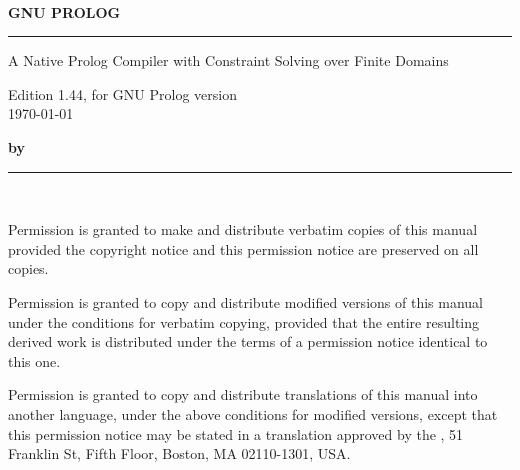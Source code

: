\pagestyle{empty}
\setlength{\parskip}{0pt}
~

\vspace{4cm}
{\huge\bf GNU PROLOG}
\vspace{3mm}

\rule[2mm]{\linewidth}{2mm}

\begin{flushright}
{\Large
A Native Prolog Compiler with Constraint Solving over Finite Domains

Edition 1.44, for GNU Prolog version \\
\today
}
\end{flushright}
\vspace{5cm}
\vspace{5cm}

{\Large\bf by }

\rule[2mm]{\linewidth}{1mm}



\newpage
~

\vspace{17cm}

\setlength{\parskip}{\saveparskip}



Permission is granted to make and distribute verbatim copies of this manual
provided the copyright notice and this permission notice are preserved on all
copies.

Permission is granted to copy and distribute modified versions of this manual
under the conditions for verbatim copying, provided that the entire resulting
derived work is distributed under the terms of a permission notice identical
to this one.

Permission is granted to copy and distribute translations of this manual into
another language, under the above conditions for modified versions, except
that this permission notice may be stated in a translation approved by the
, 51 Franklin St, Fifth Floor, Boston, MA  02110-1301, USA.


\newpage
\pagestyle{fancy}
\setcounter{page}{1}

